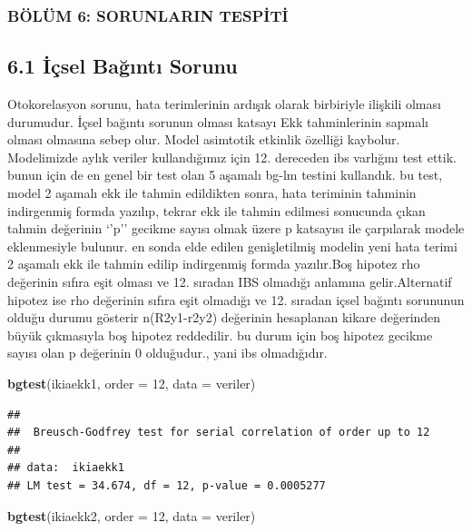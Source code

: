 \documentclass[]{article}
\newenvironment{Shaded}{\begin{snugshade}}{\end{snugshade}}
\newcommand{\KeywordTok}[1]{\textcolor[rgb]{0.13,0.29,0.53}{\textbf{#1}}}
\newcommand{\DataTypeTok}[1]{\textcolor[rgb]{0.13,0.29,0.53}{#1}}
\newcommand{\DecValTok}[1]{\textcolor[rgb]{0.00,0.00,0.81}{#1}}
\newcommand{\NormalTok}[1]{#1}
\begin{document}
\subsubsection{BÖLÜM 6: SORUNLARIN
TESPİTİ}\label{bolum-6-sorunlarin-tespiti}

\subsection{6.1 İçsel Bağıntı Sorunu}\label{icsel-bagnt-sorunu}

Otokorelasyon sorunu, hata terimlerinin ardışık olarak birbiriyle
ilişkili olması durumudur. İçsel bağıntı sorunun olması katsayı Ekk
tahminlerinin sapmalı olması olmasına sebep olur. Model asimtotik
etkinlik özelliği kaybolur. Modelimizde aylık veriler kullandığımız için
12. dereceden ibs varlığını test ettik. bunun için de en genel bir test
olan 5 aşamalı bg-lm testini kullandık. bu test, model 2 aşamalı ekk ile
tahmin edildikten sonra, hata teriminin tahminin indirgenmiş formda
yazılıp, tekrar ekk ile tahmin edilmesi sonucunda çıkan tahmin değerinin
`'p'' gecikme sayısı olmak üzere p katsayısı ile çarpılarak modele
eklenmesiyle bulunur. en sonda elde edilen genişletilmiş modelin yeni
hata terimi 2 aşamalı ekk ile tahmin edilip indirgenmiş formda
yazılır.Boş hipotez rho değerinin sıfıra eşit olması ve 12. sıradan IBS
olmadığı anlamına gelir.Alternatif hipotez ise rho değerinin sıfıra eşit
olmadığı ve 12. sıradan içsel bağıntı sorununun olduğu durumu gösterir
n(R2y1-r2y2) değerinin hesaplanan kikare değerinden büyük çıkmasıyla boş
hipotez reddedilir. bu durum için boş hipotez gecikme sayısı olan p
değerinin 0 olduğudur., yani ibs olmadığıdır.

\begin{Shaded}
\begin{Highlighting}[]
\KeywordTok{bgtest}\NormalTok{(ikiaekk1, }\DataTypeTok{order =} \DecValTok{12}\NormalTok{, }\DataTypeTok{data =}\NormalTok{ veriler)}
\end{Highlighting}
\end{Shaded}

\begin{verbatim}
## 
##  Breusch-Godfrey test for serial correlation of order up to 12
## 
## data:  ikiaekk1
## LM test = 34.674, df = 12, p-value = 0.0005277
\end{verbatim}

\begin{Shaded}
\begin{Highlighting}[]
\KeywordTok{bgtest}\NormalTok{(ikiaekk2, }\DataTypeTok{order =} \DecValTok{12}\NormalTok{, }\DataTypeTok{data =}\NormalTok{ veriler)}
\end{Highlighting}
\end{Shaded}
\end{document}
